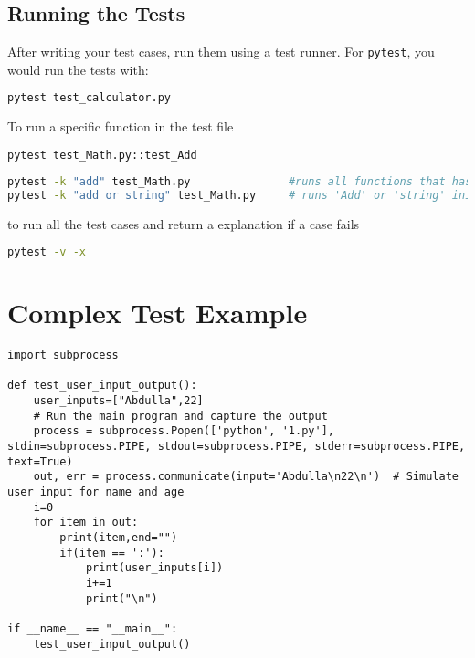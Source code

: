 \documentclass{article}
\begin{document}
\subsection{Running the Tests}

After writing your test cases, run them using a test runner. For \texttt{pytest}, you would run the tests with:

\begin{lstlisting}[language=bash]
pytest test_calculator.py
\end{lstlisting}

To run a specific function in the test file
\begin{lstlisting}[language=bash]
pytest test_Math.py::test_Add
\end{lstlisting}

\begin{lstlisting}[language=bash]
pytest -k "add" test_Math.py               #runs all functions that has 'Add' init
pytest -k "add or string" test_Math.py     # runs 'Add' or 'string' init
\end{lstlisting}

to run all the test cases and return a explanation if a case fails
\begin{lstlisting}[language=bash]
pytest -v -x
\end{lstlisting}

\newpage
\section{Complex Test Example}

\begin{lstlisting}[style=python]
import subprocess

def test_user_input_output():
    user_inputs=["Abdulla",22]
    # Run the main program and capture the output
    process = subprocess.Popen(['python', '1.py'], stdin=subprocess.PIPE, stdout=subprocess.PIPE, stderr=subprocess.PIPE, text=True)
    out, err = process.communicate(input='Abdulla\n22\n')  # Simulate user input for name and age
    i=0
    for item in out:
        print(item,end="")
        if(item == ':'):
            print(user_inputs[i])
            i+=1
            print("\n")

if __name__ == "__main__":
    test_user_input_output()
\end{lstlisting}
\end{document}
